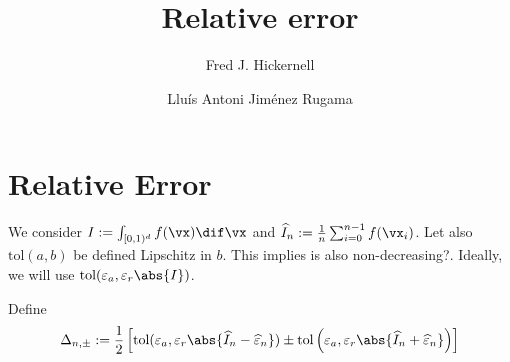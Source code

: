 \documentclass[]{elsarticle}
\theoremstyle{definition}
\newcommand{\cube}{[0,1)^d}
\newcommand{\tol}{\text{tol}}
\begin{document}
\begin{frontmatter}

\title{Relative error}
\author{Fred J. Hickernell}
\address{Room E1-208, Department of Applied Mathematics, Illinois Institute of Technology,\\ 10 W.\ 32$^{\text{nd}}$ St., Chicago, IL 60616}
\author{Llu\'{i}s Antoni Jim\'{e}nez Rugama}
\address{Room E1-120, Department of Applied Mathematics, Illinois Institute of Technology,\\ 10 W.\ 32$^{\text{nd}}$ St., Chicago, IL 60616}
\begin{abstract}
\end{abstract}

\end{frontmatter}

\section{Relative Error}
We consider $I:=\int_{\cube}f(\vx)\dif \vx$ and $\widehat{I}_n:=\frac 1 n \sum_{i=0}^{n-1}f(\vx_i)$. Let also $\tol(a,b)$ be defined Lipschitz in $b$. This implies is also non-decreasing?. Ideally, we will use $\tol(\varepsilon_a,\varepsilon_r\abs{I})$.

Define
\[
\Delta_{n,\pm}:=\frac 1 2 \left[ \tol(\varepsilon_a,\varepsilon_r\abs{\widehat{I}_n-\widehat{\varepsilon}_n}) \pm \tol\left(\varepsilon_a,\varepsilon_r\abs{\widehat{I}_n+\widehat{\varepsilon}_n}\right) \right]
\]
\end{document}

